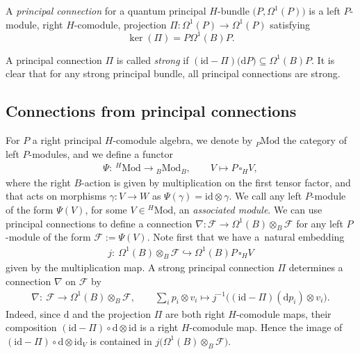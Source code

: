 \documentclass[pdftex]{sigma}
\numberwithin{equation}{section}
\begin{document}
\begin{defn}
A {\em principal connection} for a quantum principal $H$-bundle $\big(P,\Omega^1(P)\big)$ is a left $P$-module, right $H$-comodule, projection $\Pi\colon \Omega^1(P) \to \Omega^1(P)$ satisfying
\[
\ker(\Pi) = P\Omega^1(B)P.
\]
\end{defn}
A principal connection $\Pi$ is called {\em strong} if $(\mathrm{id} - \Pi) \big(\mathrm{d} P\big) \subseteq \Omega^1(B)P$. It is clear that for any strong principal bundle, all principal connections are strong.

\subsection{Connections from principal connections} \label{subsection:ConnFromPrinCs}

For $P$ a right principal $H$-comodule algebra, we denote by ${}_P\mathrm{Mod}$ the category of left $P$-modules, and we define a functor
\begin{gather*}
\Psi\colon \ {}^{H}\mathrm{Mod} \to {}_B\mathrm{Mod}_B, \qquad V \mapsto P \, \square_H V,
\end{gather*}
where the right $B$-action is given by multiplication on the first tensor factor, and that acts on morphisms $\gamma\colon V \to W$ as $\Psi(\gamma) = \mathrm{id} \otimes \gamma$. We call any left $P$-module of the form $\Psi(V)$, for some $V \in {}^H\mathrm{Mod}$, an \emph{associated module}. We can use principal connections to define a connection $\nabla\colon \mathcal{F} \to \Omega^1(B) \otimes_B \mathcal{F}$ for any left $P$-module of the form $\mathcal{F} := \Psi(V).$
Note first that we have a~natural embedding
\begin{gather*}
j\colon \ \Omega^1(B) \otimes_B \mathcal{F} \hookrightarrow \Omega^1(B)P \, \square_H V
\end{gather*}
given by the multiplication map.
A strong principal connection $\Pi$ determines a connection $\nabla$ on $\mathcal{F}$ by
\begin{gather*}%
 \nabla\colon \ \mathcal{F} \to \Omega^1(B) \otimes_B \mathcal{F}, \qquad \sum_i p_i \otimes v_i \mapsto j^{-1} \big((\mathrm{id} - \Pi)(\mathrm{d} p_i) \otimes v_i \big).
\end{gather*}
Indeed, since $\mathrm{d}$ and the projection $\Pi$ are both right \mbox{$H$-comodule} maps, their composition $(\mathrm{id} - \Pi) \allowbreak \circ \mathrm{d} \otimes \mathrm{id}$ is a right $H$-comodule map. Hence the image of $(\mathrm{id} - \Pi) \circ \mathrm{d}\otimes \mathrm{id}_V$ is contained in $j\big(\Omega^1(B) \otimes_B \mathcal{F}\big)$.
\end{document}
